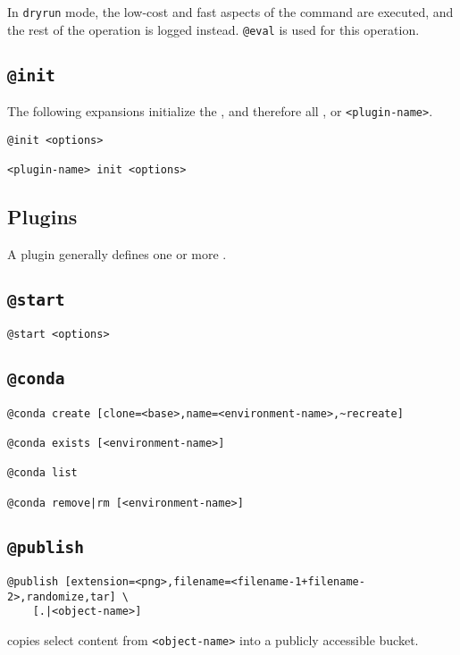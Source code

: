In \texttt{dryrun} mode, the low-cost and fast aspects of the command are executed, and the rest of the operation is logged instead. \texttt{@eval} is used for this operation. 




\subsection{\texttt{@init}}
\label{init}

The following expansions initialize the , and therefore all , or \texttt{<plugin-name>}.
%
\begin{verbatim}
@init <options>

<plugin-name> init <options>
\end{verbatim}

\subsection{Plugins}
\label{plugins}

A plugin generally defines one or more .

\subsection{\texttt{@start}}
\label{start}

\begin{verbatim}
@start <options>
\end{verbatim}

\subsection{\texttt{@conda}}
\label{conda}

\begin{verbatim}
@conda create [clone=<base>,name=<environment-name>,~recreate]

@conda exists [<environment-name>]

@conda list

@conda remove|rm [<environment-name>]
\end{verbatim}

\subsection{\texttt{@publish}}
\label{publish}

\begin{verbatim}
@publish [extension=<png>,filename=<filename-1+filename-2>,randomize,tar] \
    [.|<object-name>]
\end{verbatim}
%
copies select content from \texttt{<object-name>} into a publicly accessible bucket.


